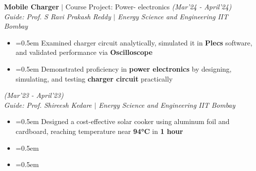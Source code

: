 \documentclass{article}
\begin{document}
\vspace{-5pt}

\noindent
{\fontsize{12}{12} \textbf{Mobile Charger} $|$ Course Project: Power- electronics}  \hfill{\sl \small (Mar'24 - April'24)}\\
{\it Guide: Prof. S Ravi Prakash Reddy $|$ Energy Science and Engineering} \hfill{\it IIT Bombay}\hspace{-2pt}
\vspace{-7pt}
\begin{itemize}[label=\textcolor{myblue}{\textbullet},itemsep = -1.25mm, leftmargin=5.5mm]
\item{}\font=0.5em Examined charger circuit analytically, simulated it in \textbf{Plecs} software, and validated performance via \textbf{Oscilloscope}
\item{}\font=0.5em Demonstrated proficiency in \textbf{power electronics} by designing, simulating, and testing \textbf{charger circuit} practically
\end{itemize}
\vspace{-5pt}

  \hfill{\sl \small (Mar’23 - April’23)}\\
{\it Guide: Prof. Shireesh Kedare $|$ Energy Science and Engineering} \hfill{\it IIT Bombay}\hspace{-2pt}
 
\vspace{-7pt}
\begin{itemize}[label=\textcolor{myblue}{\textbullet},itemsep = -1.25mm, leftmargin=5.5mm]
 
\item{}\font=0.5em Designed a cost-effective solar cooker using aluminum foil and cardboard, reaching temperature near \textbf{94°C} in \textbf{1 hour}
\item{}\font=0.5em 
\item{}\font=0.5em 
 
\end{itemize}
\end{document}
